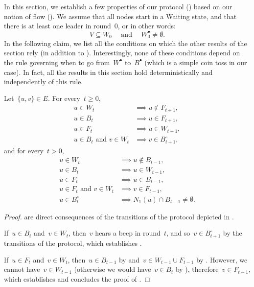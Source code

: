 \documentclass{article}
\newcommand{\lead}{\bullet}
\newcommand{\nlead}{\circ}
\begin{document}
In this section, we establish a few properties of our protocol () based on our notion of flow ().
We assume that all nodes start in a Waiting state, and that there is at least one leader in round~$0$, or in other words:
\begin{equation} \label{eq:initialization_condition}
    V \subseteq W_0 \quad \text{ and } \quad W_0^\lead \neq \emptyset.
\end{equation}
In the following claim, we list all the conditions on which the other results of the section rely (in addition to ).
Interestingly, none of these conditions depend on the rule governing when to go from~$W^\lead$ to~$B^\lead$ (which is a simple coin toss in our case). In fact, all the results in this section hold deterministically and independently of this rule.
\begin{claim}  \label{claim:transitions}
    Let~$\{u,v\} \in E$.
    For every~$t\geq 0$,
    \begin{align}
        u \in W_t &\implies u \notin F_{t+1}, \label{eq:W_next} \\
        u \in B_t &\implies u \in F_{t+1}, \label{eq:B_next} \\
        u \in F_t &\implies u \in W_{t+1}, \label{eq:F_next} \\
        u \in B_t \text{ and } v \in W_t &\implies v \in B^\nlead_{t+1}, \label{eq:WB_next}
    \end{align}
    and for every~$t>0$,
    \begin{align}
        u \in W_t &\implies u \notin B_{t-1}, \label{eq:W_previous} \\
        u \in B_t &\implies u \in W_{t-1}, \label{eq:B_previous} \\
        u \in F_t &\implies u \in B_{t-1}, \label{eq:F_previous} \\
        u \in F_t \text{ and } v \in W_t &\implies v \in F_{t-1}, \label{eq:WF_previous} \\
        u \in B_t^\nlead &\implies N_1(u) \cap B_{t-1} \neq \emptyset. \label{eq:B_nlead_previous}
    \end{align}
\end{claim}
\begin{proof}
     are direct consequences of the transitions of the protocol depicted in .
    
    If~$u \in B_t$ and~$v \in W_t$, then~$v$ hears a beep in round~$t$, and so~$v \in B^\nlead_{t+1}$ by the transitions of the protocol, which establishes .
    
    If~$u \in F_t$ and~$v \in W_t$, then~$u \in B_{t-1}$ by  and~$v \in W_{t-1} \cup F_{t-1}$ by .
    However, we cannot have~$v \in W_{t-1}$ (otherwise we would have~$v \in B_t$ by ), therefore~$v \in F_{t-1}$, which establishes  and concludes the proof of .
\end{proof}
\end{document}
